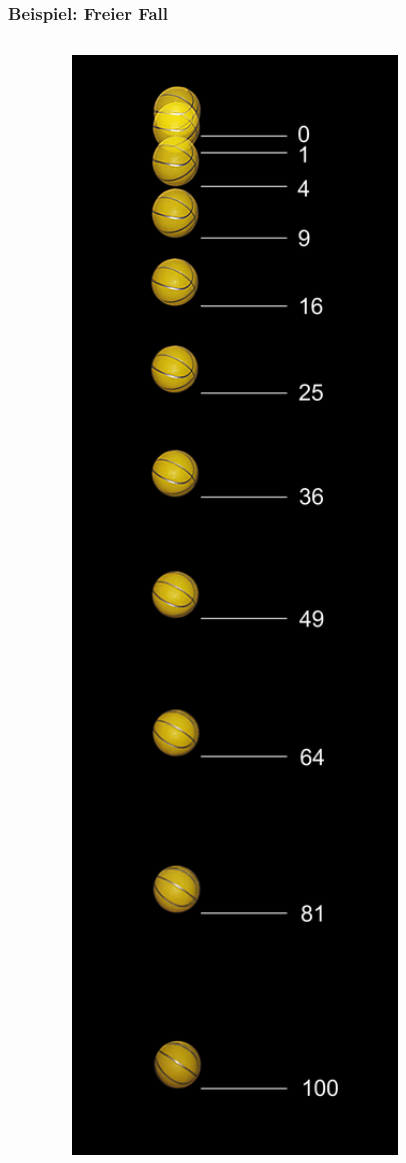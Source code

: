 \documentclass{beamer}
\begin{document}
\begin{frame}
\frametitle{Beispiel: Freier Fall}


\begin{columns}[c]

\begin{column}{2cm}

\begin{center}
\includegraphics[width=0.9\textwidth]{freier_fall.jpg}
\end{center}



\end{column}
\end{columns}
\end{frame}
\end{document}
